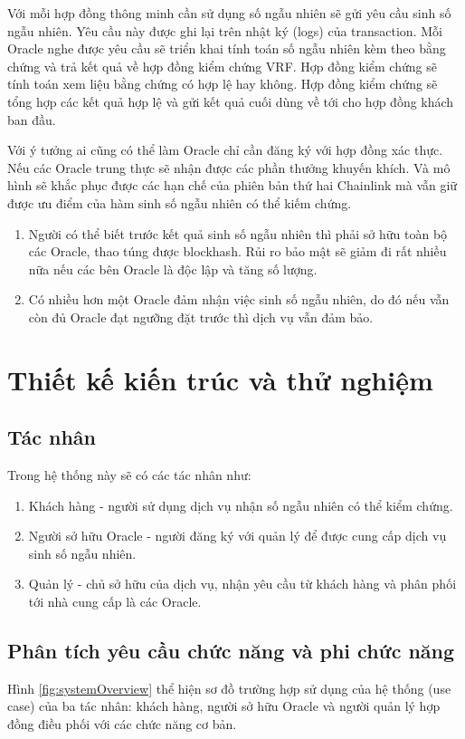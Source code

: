 \documentclass[../main.tex]{subfiles}
\begin{document}
Với mỗi hợp đồng thông minh cần sử dụng số ngẫu nhiên sẽ gửi yêu cầu sinh số ngẫu nhiên. Yêu cầu này được ghi lại trên nhật ký (logs) của transaction. Mỗi Oracle nghe được yêu cầu sẽ triển khai tính toán số ngẫu nhiên kèm theo bằng chứng và trả kết quả về hợp đồng kiểm chứng VRF. Hợp đồng kiểm chứng sẽ tính toán xem liệu bằng chứng có hợp lệ hay không. Hợp đồng kiểm chứng sẽ tổng hợp các kết quả hợp lệ và gửi kết quả cuối dùng về tới cho hợp đồng khách ban đầu.

Với ý tưởng ai cũng có thể làm Oracle chỉ cần đăng ký với hợp đồng xác thực. Nếu các Oracle trung thực sẽ nhận được các phần thưởng khuyến khích. Và mô hình sẽ khắc phục được các hạn chế của phiên bản thứ hai Chainlink mà vẫn giữ được ưu điểm của hàm sinh số ngẫu nhiên có thể kiếm chứng. 
\begin{enumerate}
    \item Người có thể biết trước kết quả sinh số ngẫu nhiên thì phải sở hữu toàn bộ các Oracle, thao túng được blockhash. Rủi ro bảo mật sẽ giảm đi rất nhiều nữa nếu các bên Oracle là độc lập và tăng số lượng.
    \item Có nhiều hơn một Oracle đảm nhận việc sinh số ngẫu nhiên, do đó nếu vẫn còn đủ Oracle đạt ngưỡng đặt trước thì dịch vụ vẫn đảm bảo.
\end{enumerate}

\section{Thiết kế kiến trúc và thử nghiệm}
\subsection{Tác nhân}
Trong hệ thống này sẽ có các tác nhân như:
\begin{enumerate}
    \item Khách hàng - người sử dụng dịch vụ nhận số ngẫu nhiên có thể kiểm chứng.
    \item Người sở hữu Oracle - người đăng ký với quản lý để được cung cấp dịch vụ sinh số ngẫu nhiên.
    \item Quản lý - chủ sở hữu của dịch vụ, nhận yêu cầu từ khách hàng và phân phối tới nhà cung cấp là các Oracle. 
\end{enumerate}

\subsection{Phân tích yêu cầu chức năng và phi chức năng}
Hình \ref{fig:systemOverview} thể hiện sơ đồ trường hợp sử dụng của hệ thống (use case) của ba tác nhân: khách hàng, người sở hữu Oracle và người quản lý hợp đồng điều phối với các chức năng cơ bản.
\end{document}
